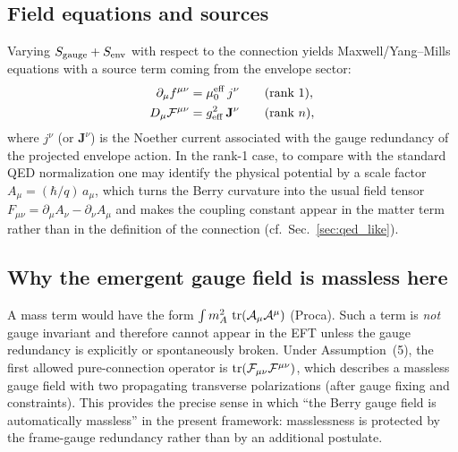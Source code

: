 \documentclass[11pt,a4paper]{article}
\newcommand{\bbA}{\mathcal{A}}              %
\newcommand{\bbF}{\mathcal{F}}              %
\begin{document}
\subsection{Field equations and sources}
Varying \(S_{\rm gauge}+S_{\rm env}\) with respect to the connection yields Maxwell/Yang--Mills equations with a source term
coming from the envelope sector:
\begin{align}
\partial_\mu f^{\mu\nu} &= \mu_0^{\rm eff}\, j^\nu
\qquad\text{(rank \(1\))},\\
D_\mu \bbF^{\mu\nu} &= g_{\rm eff}^2\, \mathbf{J}^\nu
\qquad\text{(rank \(n\))},
\end{align}
where \(j^\nu\) (or \(\mathbf{J}^\nu\)) is the Noether current associated with the gauge redundancy of the projected envelope action.
In the rank-1 case, to compare with the standard QED normalization one may identify the physical potential by a scale factor
\(A_\mu = (\hbar/q)\,a_\mu\), which turns the Berry curvature into the usual field tensor \(F_{\mu\nu}=\partial_\mu A_\nu-\partial_\nu A_\mu\)
and makes the coupling constant appear in the matter term rather than in the definition of the connection (cf.~Sec.~\ref{sec:qed_like}).

\subsection{Why the emergent gauge field is massless here}
A mass term would have the form \(\int m_A^2\,\tr(\bbA_\mu\bbA^\mu)\) (Proca).
Such a term is \emph{not} gauge invariant and therefore cannot appear in the EFT unless the gauge redundancy is explicitly or spontaneously broken.
Under Assumption~(5), the first allowed pure-connection operator is \(\tr(\bbF_{\mu\nu}\bbF^{\mu\nu})\), which describes a massless gauge field
with two propagating transverse polarizations (after gauge fixing and constraints).
This provides the precise sense in which ``the Berry gauge field is automatically massless'' in the present framework:
masslessness is protected by the frame-gauge redundancy rather than by an additional postulate.
\end{document}
